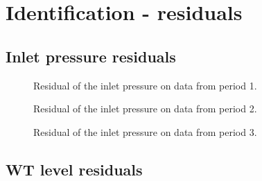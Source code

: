 \chapter{Identification - residuals}
\label{identification_residuals}

\section{Inlet pressure residuals}
\label{inlet_pres_res}

  \begin{figure}[H]
  \centering
   
  \vspace{-2.5mm}
  \caption{Residual of the inlet pressure on data from period 1.}
  \label{fig:residual_pk2_p1}
  \end{figure}
 \vspace{-5mm}

  \begin{figure}[H]
  \centering
   
  \vspace{-2.5mm}
  \caption{Residual of the inlet pressure on data from period 2.}
  \label{fig:residual_pk2_p2}
  \end{figure}
 \vspace{-5mm}

  \begin{figure}[H]
  \centering
   
  \vspace{-2.5mm}
  \caption{Residual of the inlet pressure on data from period 3.}
  \label{fig:residual_pk2_p3}
  \end{figure}
 \vspace{-5mm}

\section{WT level residuals}
\label{WT_level_res}

